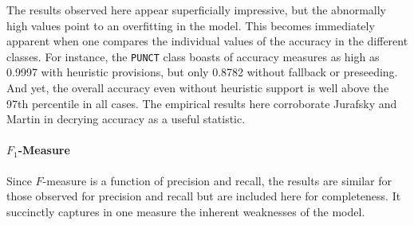 \documentclass[11pt,a4paper]{article}
\begin{document}

{\tiny\pgfplotstabletypeset[header=true]{\amicro}}

The results observed here appear superficially impressive,
but the abnormally high values point to an overfitting in the model.
This becomes immediately apparent when one compares the individual
values of the accuracy in the different classes. For instance,
the \texttt{PUNCT} class boasts of accuracy measures as high
as 0.9997 with heuristic provisions, but only 0.8782 without
fallback or preseeding. And yet, the overall accuracy even without
heuristic support is well above the 97th percentile in all cases.
The empirical results here corroborate Jurafsky and Martin 
in decrying accuracy as a useful statistic.

\paragraph{$F_{1}$-Measure}

Since $F$-measure is a function of precision and recall, the results are
similar for those observed for precision and recall but are included
here for completeness. It succinctly captures in one measure the
inherent weaknesses of the model.

\end{document}
